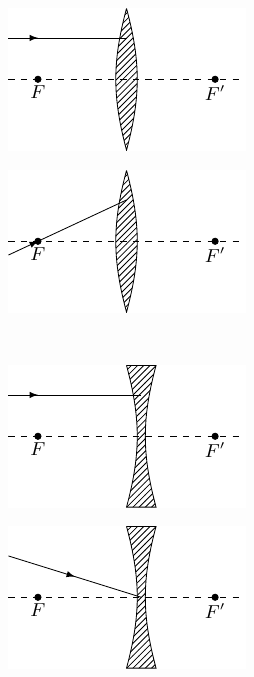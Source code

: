 \begin{figure}[htbp]
    \centering
    \begin{subfigure}{0.4\linewidth}
        \centering
        \includegraphics{fig/C/5-37a.pdf}
        \caption{}\label{fig_C_5-37a}
    \end{subfigure}
    \hfil
    \begin{subfigure}{0.4\linewidth}
        \centering
        \includegraphics{fig/C/5-37b.pdf}
        \caption{}\label{fig_C_5-37b}
    \end{subfigure}
    \\
    \begin{subfigure}{0.3\linewidth}
        \centering
        \includegraphics{fig/C/5-37c.pdf}
        \caption{}\label{fig_C_5-37c}
    \end{subfigure}
    \hfill
    \begin{subfigure}{0.3\linewidth}
        \centering
        \includegraphics{fig/C/5-37d.pdf}

\end{subfigure}
\end{figure}
